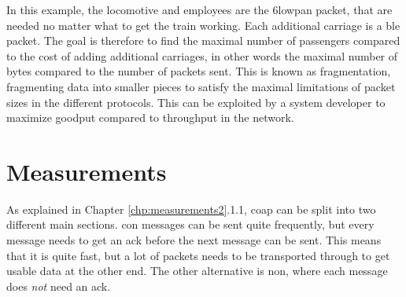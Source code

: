 \noindent In this example, the locomotive and employees are the \gls{6lowpan} packet, that are needed no matter what to get the train working. Each additional carriage is a \gls{ble} packet. The goal is therefore to find the maximal number of passengers compared to the cost of adding additional carriages, in other words the maximal number of bytes compared to the number of packets sent. This is known as fragmentation, fragmenting data into smaller pieces to satisfy the maximal limitations of packet sizes in the different protocols. This can be exploited by a system developer to maximize \gls{goodput} compared to \gls{throughput} in the network.
 


\section{Measurements}

\noindent As explained in Chapter \ref{chp:measurements2}.1.1, \gls{coap} can be split into two different main sections. \gls{con} messages can be sent quite frequently, but every message needs to get an \gls{ack} before the next message can be sent. This means that it is quite fast, but a lot of packets needs to be transported through to get usable data at the other end. The other alternative is \gls{non}, where each message does \textit{not} need an \gls{ack}. 






